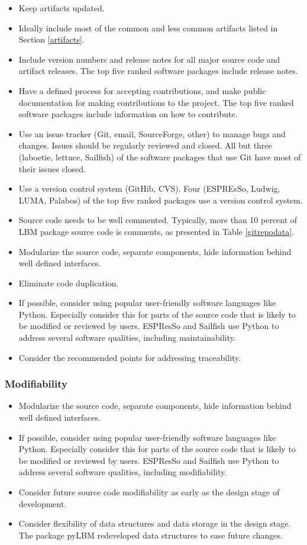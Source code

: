 \documentclass[12pt, notitlepage]{article}
\begin{document}
\begin{itemize}
	\item Keep artifacts updated.
	\item Ideally include most of the common and less common artifacts listed in Section \ref{artifacts}.
	\item Include version numbers and release notes for all major source code and artifact releases. The top five ranked software packages include release notes.
	\item Have a defined process for accepting contributions, and make public documentation for making contributions to the project. The top five ranked software packages include information on how to contribute. 
	\item Use an issue tracker (Git, email, SourceForge, other) to manage bugs and changes. Issues should be regularly reviewed and closed. All but three (laboetie, lettuce, Sailfish) of the software packages that use Git have most of their issues closed.
	\item Use a version control system (GitHib, CVS). Four (ESPREsSo, Ludwig, LUMA, Palabos) of the top five ranked packages use a version control system.
	\item Source code needs to be well commented. Typically, more than 10 percent of LBM package source code is comments, as presented in Table \ref{gitrepodata}.
	\item Modularize the source code, separate components, hide information behind well defined interfaces.
	\item Eliminate code duplication.
	\item If possible, consider using popular user-friendly software languages like Python. Especially consider this for parts of the source code that is likely to be modified or reviewed by users. ESPResSo and Sailfish use Python to address several software qualities, including maintainability.
	\item Consider the recommended points for addressing traceability.
\end{itemize}

\subsubsection{Modifiability}

\begin{itemize}
	\item Modularize the source code, separate components, hide information behind well defined interfaces.
	\item If possible, consider using popular user-friendly software languages like Python. Especially consider this for parts of the source code that is likely to be modified or reviewed by users. ESPResSo and Sailfish use Python to address several software qualities, including modifiability.
	\item Consider future source code modifiability as early as the design stage of development.
	\item Consider flexibility of data structures and data storage in the design stage. The package pyLBM redeveloped data structures to ease future changes.
\end{itemize}
\end{document}
